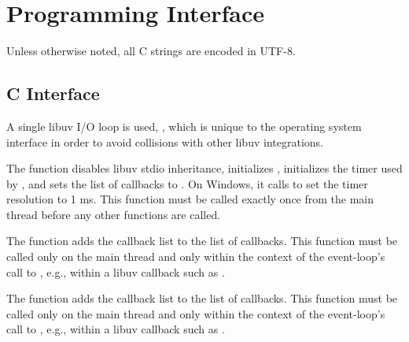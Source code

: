 \section {Programming Interface}\label{sec:osi-api}

Unless otherwise noted, all C strings are encoded in UTF-8.

\subsection {C Interface}

A single libuv I/O loop is used, , which is unique to
the operating system interface in order to avoid collisions with other
libuv integrations.

\begin{function}
\end{function}

The  function disables libuv stdio inheritance,
initializes , initializes the timer used by
, and sets the list of callbacks to
\code{()}. On Windows, it calls  to set the
timer resolution to 1 ms. This function must be called exactly once
from the main thread before any other  functions are
called.

\begin{function}
\end{function}

The  function adds the callback list
 to the list of callbacks.
This function must be called only on the main thread and only within the
context of the event-loop's call to , e.g., within a
libuv callback such as .

\begin{function}
\end{function}

The  function adds the callback list
 to the list of callbacks.
This function must be called only on the main thread and only within the
context of the event-loop's call to , e.g., within a
libuv callback such as .


